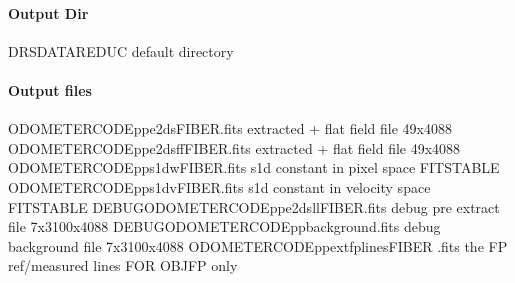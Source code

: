 \documentclass[a4paper,10pt,english]{report}
\begin{document}
\paragraph{Output Dir}
\label{\detokenize{user/spirou/recipes/extraction:output-dir}}
\begin{sphinxVerbatim}[commandchars=\\\{\}]
DRS\PYGZus{}DATA\PYGZus{}REDUC    default  directory
\end{sphinxVerbatim}


\paragraph{Output files}
\label{\detokenize{user/spirou/recipes/extraction:output-files}}
\begin{sphinxVerbatim}[commandchars=\\\{\}]
ODOMETER\PYGZus{}CODE\PYGZus{}pp\PYGZus{}e2ds\PYGZus{}FIBER.fits               extracted + flat field file 49x4088
ODOMETER\PYGZus{}CODE\PYGZus{}pp\PYGZus{}e2dsff\PYGZus{}FIBER.fits             extracted + flat field file 49x4088
ODOMETER\PYGZus{}CODE\PYGZus{}pp\PYGZus{}s1d\PYGZus{}w\PYGZus{}FIBER.fits              s1d constant in pixel space FITS\PYGZhy{}TABLE
ODOMETER\PYGZus{}CODE\PYGZus{}pp\PYGZus{}s1d\PYGZus{}v\PYGZus{}FIBER.fits              s1d constant in velocity space FITS\PYGZhy{}TABLE
DEBUG\PYGZus{}ODOMETER\PYGZus{}CODE\PYGZus{}pp\PYGZus{}e2dsll\PYGZus{}FIBER.fits       debug pre extract file 7x3100x4088
DEBUG\PYGZus{}ODOMETER\PYGZus{}CODE\PYGZus{}pp\PYGZus{}background.fits           debug background file 7x3100x4088
ODOMETER\PYGZus{}CODE\PYGZus{}pp\PYGZus{}ext\PYGZus{}fplines\PYGZus{}FIBER .fits       the FP ref/measured lines FOR OBJ\PYGZus{}FP only
\end{sphinxVerbatim}
\end{document}
